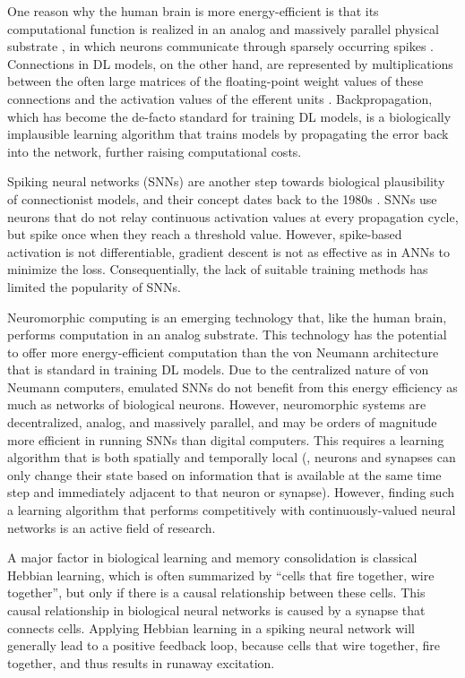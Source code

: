 One reason why the human brain is more energy-efficient is that its computational function is realized in an analog and massively parallel physical substrate \citep{a2017parallel}, in which neurons communicate through sparsely occurring spikes \citep{bear2020neuroscience}.
Connections in DL models, on the other hand, are represented by multiplications between the often large matrices of the floating-point weight values of these connections and the activation values of the efferent units \citep{lecun2015deep}.
Backpropagation, which has become the de-facto standard for training DL models, is a biologically implausible learning algorithm that trains models by propagating the error back into the network, further raising computational costs.

Spiking neural networks (SNNs) are another step towards biological plausibility of connectionist models, and their concept dates back to the 1980s \citep{hopfield1982neural}.
SNNs use neurons that do not relay continuous activation values at every propagation cycle, but spike once when they reach a threshold value.
However, spike-based activation is not differentiable, gradient descent is not as effective as in ANNs to minimize the loss.
Consequentially, the lack of suitable training methods has limited the popularity of SNNs.

Neuromorphic computing is an emerging technology that, like the human brain, performs computation in an analog substrate.
This technology has the potential to offer more energy-efficient computation than the von Neumann architecture that is standard in training DL models.
Due to the centralized nature of von Neumann computers, emulated SNNs do not benefit from this energy efficiency as much as networks of biological neurons.
However, neuromorphic systems are decentralized, analog, and massively parallel, and may be orders of magnitude more efficient in running SNNs than digital computers.
This requires a learning algorithm that is both spatially and temporally local (\ie, neurons and synapses can only change their state based on information that is available at the same time step and immediately adjacent to that neuron or synapse).
However, finding such a learning algorithm that performs competitively with continuously-valued neural networks is an active field of research.

A major factor in biological learning and memory consolidation is classical Hebbian learning, which is often summarized by ``cells that fire together, wire together'', but only if there is a causal relationship between these cells.
This causal relationship in biological neural networks is caused by a synapse that connects cells.
Applying Hebbian learning in a spiking neural network will generally lead to a positive feedback loop, because cells that wire together, fire together, and thus results in runaway excitation.

